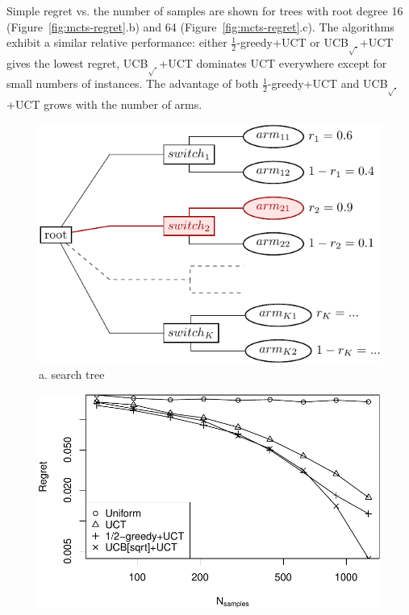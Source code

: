 \documentclass[letterpaper]{article}
\begin{document}
Simple regret vs. the number of samples are shown for trees with root degree 16
(Figure~\ref{fig:mcts-regret}.b) and 64 (Figure~\ref{fig:mcts-regret}.c).
The algorithms exhibit a similar relative performance: either $\frac 1
2$-greedy+UCT or UCB$_{\sqrt{\cdot}}$+UCT
gives the lowest regret, UCB$_{\sqrt{\cdot}}$+UCT dominates UCT everywhere
except for small numbers of instances. The advantage of both $\frac 1
2$-greedy+UCT and UCB$_{\sqrt{\cdot}}$+UCT grows with the number of arms.

\begin{figure}[h!]
  \begin{minipage}[c]{1.0\linewidth}
    \centering
    \includegraphics[scale=0.7]{twolevel-tree.pdf}\\
    a. search tree
    \vspace{0.5em}
  \end{minipage}
  \begin{minipage}[c]{1.0\linewidth}
    \centering
    \includegraphics[scale=0.45]{tree-identity-k=16-uqb=8.pdf}\\ 

\end{minipage}
\end{figure}
\end{document}
